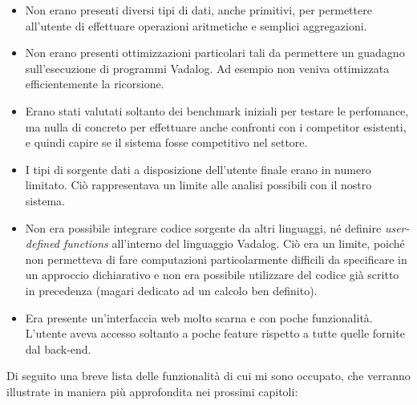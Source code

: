 \begin{itemize}
	\item Non erano presenti diversi tipi di dati, anche primitivi, per permettere all'utente di effettuare operazioni aritmetiche e semplici aggregazioni. 
	\item Non erano presenti ottimizzazioni particolari tali da permettere un guadagno sull'esecuzione di programmi Vadalog. Ad esempio non veniva ottimizzata efficientemente la ricorsione. 
	\item Erano stati valutati soltanto dei benchmark iniziali per testare le perfomance, ma nulla di concreto per effettuare anche confronti con i competitor esistenti, e quindi capire se il sistema fosse competitivo nel settore.
	\item I tipi di sorgente dati a disposizione dell'utente finale erano in numero limitato. Ciò rappresentava un limite alle analisi possibili con il nostro sistema. 
	\item Non era possibile integrare codice sorgente da altri linguaggi, né definire \emph{user-defined functions} all'interno del linguaggio Vadalog. Ciò era un limite, poiché non permetteva di fare computazioni particolarmente difficili da specificare in un approccio dichiarativo e non era possibile utilizzare del codice già scritto in precedenza (magari dedicato ad un calcolo ben definito).
	\item Era presente un'interfaccia web molto scarna e con poche funzionalità. L'utente aveva accesso soltanto a poche feature rispetto a tutte quelle fornite dal back-end.
\end{itemize}
Di seguito una breve lista delle funzionalità di cui mi sono occupato, che verranno illustrate in maniera più approfondita nei prossimi capitoli:
